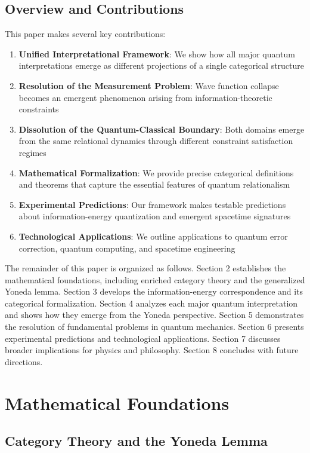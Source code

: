 \documentclass[12pt,a4paper]{article}
\begin{document}
\subsection{Overview and Contributions}

This paper makes several key contributions:
\begin{enumerate}
\item \textbf{Unified Interpretational Framework}: We show how all major quantum interpretations emerge as different projections of a single categorical structure
\item \textbf{Resolution of the Measurement Problem}: Wave function collapse becomes an emergent phenomenon arising from information-theoretic constraints
\item \textbf{Dissolution of the Quantum-Classical Boundary}: Both domains emerge from the same relational dynamics through different constraint satisfaction regimes
\item \textbf{Mathematical Formalization}: We provide precise categorical definitions and theorems that capture the essential features of quantum relationalism
\item \textbf{Experimental Predictions}: Our framework makes testable predictions about information-energy quantization and emergent spacetime signatures
\item \textbf{Technological Applications}: We outline applications to quantum error correction, quantum computing, and spacetime engineering
\end{enumerate}

The remainder of this paper is organized as follows. Section 2 establishes the mathematical foundations, including enriched category theory and the generalized Yoneda lemma. Section 3 develops the information-energy correspondence and its categorical formalization. Section 4 analyzes each major quantum interpretation and shows how they emerge from the Yoneda perspective. Section 5 demonstrates the resolution of fundamental problems in quantum mechanics. Section 6 presents experimental predictions and technological applications. Section 7 discusses broader implications for physics and philosophy. Section 8 concludes with future directions.

\section{Mathematical Foundations}

\subsection{Category Theory and the Yoneda Lemma}
\end{document}
